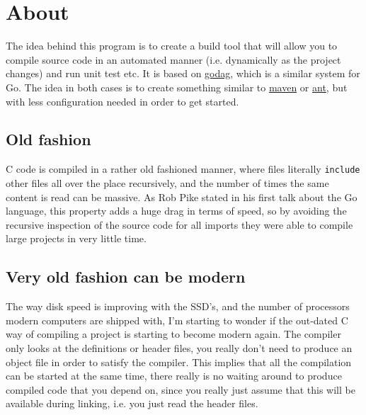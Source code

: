 
\section{ About }

The idea behind this program is to create a build tool that will allow
you to compile source code in an automated manner (i.e. dynamically
as the project changes) and run unit test etc. It is based on 
 \href{http://godag.googlecode.com}{godag}, which is a similar
system for Go. The idea in both cases is to create something similar
to  \href{https://maven.apache.org}{maven} or  \href{https://ant.apache.org}{ant},
but with less configuration needed in order to get started.



\subsection{ Old fashion }

C code is compiled in a rather old fashioned manner, where 
files literally \texttt{include} other files all over the place recursively,
and the number of times the same content is read can be massive.
As Rob Pike stated in his first talk about the Go language, this
property adds a huge drag in terms of speed, so by avoiding the
recursive inspection of the source code for all imports they were
able to compile large projects in very little time.



\subsection{ Very old fashion can be modern }

The way disk speed is improving with the SSD's, and the number of
processors modern computers are shipped with, I'm starting to wonder
if the out-dated C way of compiling a project is starting to become
modern again. The compiler only looks at the definitions or header
files, you really don't need to produce an object file in order to
satisfy the compiler. This implies that all the compilation can
be started at the same time, there really is no waiting around 
to produce compiled code that you depend on, since you really just
assume that this will be available during linking, i.e. you just
read the header files.


